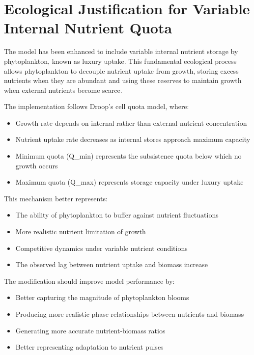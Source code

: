 \section{Ecological Justification for Variable Internal Nutrient Quota}

The model has been enhanced to include variable internal nutrient storage by phytoplankton, known as luxury uptake. This fundamental ecological process allows phytoplankton to decouple nutrient uptake from growth, storing excess nutrients when they are abundant and using these reserves to maintain growth when external nutrients become scarce.

The implementation follows Droop's cell quota model, where:
\begin{itemize}
    \item Growth rate depends on internal rather than external nutrient concentration
    \item Nutrient uptake rate decreases as internal stores approach maximum capacity
    \item Minimum quota (Q\_min) represents the subsistence quota below which no growth occurs
    \item Maximum quota (Q\_max) represents storage capacity under luxury uptake
\end{itemize}

This mechanism better represents:
\begin{itemize}
    \item The ability of phytoplankton to buffer against nutrient fluctuations
    \item More realistic nutrient limitation of growth
    \item Competitive dynamics under variable nutrient conditions
    \item The observed lag between nutrient uptake and biomass increase
\end{itemize}

The modification should improve model performance by:
\begin{itemize}
    \item Better capturing the magnitude of phytoplankton blooms
    \item Producing more realistic phase relationships between nutrients and biomass
    \item Generating more accurate nutrient-biomass ratios
    \item Better representing adaptation to nutrient pulses
\end{itemize}
